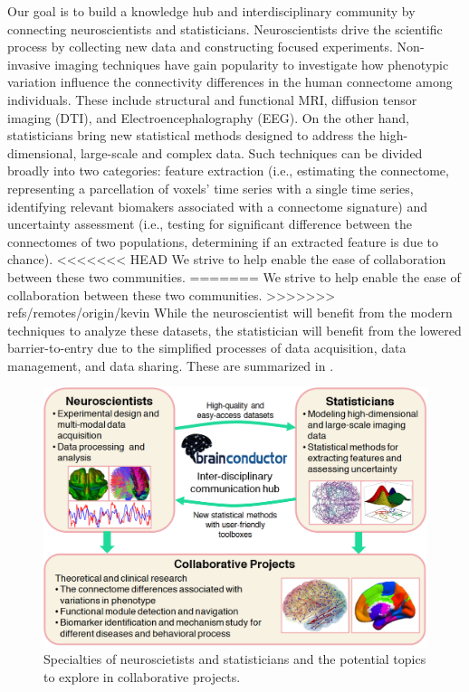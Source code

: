 \documentclass{nature}
\begin{document}
Our goal is to %
build a knowledge hub and interdisciplinary community by connecting
neuroscientists and statisticians.  Neuroscientists
drive the scientific process by collecting new data and constructing focused
experiments. Non-invasive imaging techniques have gain popularity to
investigate how phenotypic variation
influence the connectivity differences in the human
connectome among individuals\cite{sporns2005human,sporns2011human}. These
include structural and functional MRI,
diffusion tensor imaging (DTI), and Electroencephalography
(EEG).
On
the other hand, statisticians bring new statistical methods
designed to address the high-dimensional, large-scale and complex
data. Such techniques can be divided broadly into
two categories:
feature extraction (i.e., estimating the connectome, representing
a parcellation of voxels' time series with a single time series,
identifying relevant biomakers associated with a connectome signature)
and uncertainty assessment (i.e., testing for significant difference
between the connectomes of two populations, determining if 
an extracted feature is due to chance).
<<<<<<< HEAD
We strive to help enable the ease of collaboration between these two communities.
=======
We strive to help enable the ease of collaboration between these two
communities.
>>>>>>> refs/remotes/origin/kevin
While the neuroscientist will benefit from the modern techniques to
analyze these datasets, the statistician
will benefit from the lowered barrier-to-entry
due to the  simplified processes of data acquisition, data management, and data
sharing. These are summarized in .

\begin{figure}[tb]
\centering
\includegraphics[width=400pt]{fig/brainconductor/Brainconductor_overview.png}
\caption{Specialties of neuroscietists and statisticians and the potential
topics to explore in collaborative projects.}
\label{fig:overview}
\end{figure}
\end{document}
